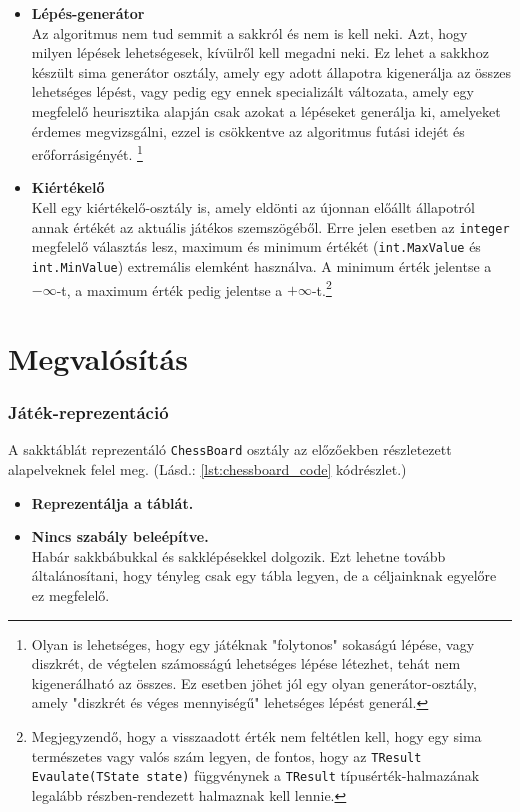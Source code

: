 \documentclass[twoside, a4paper, 12pt]{article}
\begin{document}
\begin{itemize}
	\item \textbf{Lépés-generátor} \\
	Az algoritmus nem tud semmit a sakkról és nem is kell neki. Azt, hogy milyen lépések lehetségesek, kívülről kell megadni neki. Ez lehet a sakkhoz készült sima generátor osztály, amely egy adott állapotra kigenerálja az összes lehetséges lépést, vagy pedig egy ennek specializált változata, amely egy megfelelő heurisztika alapján csak azokat a lépéseket generálja ki, amelyeket érdemes megvizsgálni, ezzel is csökkentve az algoritmus futási idejét és erőforrásigényét. \footnote{Olyan is lehetséges, hogy egy játéknak "folytonos" sokaságú lépése, vagy diszkrét, de végtelen számosságú lehetséges lépése létezhet, tehát nem kigenerálható az összes. Ez esetben jöhet jól egy olyan generátor-osztály, amely "diszkrét és véges mennyiségű" lehetséges lépést generál.}
	
	\item \textbf{Kiértékelő} \\
	Kell egy kiértékelő-osztály is, amely eldönti az újonnan előállt állapotról annak értékét az aktuális játékos szemszögéből. Erre jelen esetben az \texttt{integer} megfelelő választás lesz, maximum és minimum értékét (\texttt{int.MaxValue} és \texttt{int.MinValue}) extremális elemként használva. A minimum érték jelentse a $-\infty$-t, a maximum érték pedig jelentse a $+\infty$-t.\footnote{Megjegyzendő, hogy a visszaadott érték nem feltétlen kell, hogy egy sima természetes vagy valós szám legyen, de fontos, hogy az \texttt{TResult Evaulate(TState state)} függvénynek a \texttt{TResult} típusérték-halmazának legalább részben-rendezett halmaznak kell lennie.}
\end{itemize}























\section{Megvalósítás}

\subsubsection{Játék-reprezentáció}
A sakktáblát reprezentáló \texttt{ChessBoard} osztály az előzőekben részletezett alapelveknek felel meg. (Lásd.: \ref{lst:chessboard_code} kódrészlet.)
\begin{itemize}
	\item \textbf{Reprezentálja a táblát.}
	\item \textbf{Nincs szabály beleépítve.} \\ 
	Habár sakkbábukkal és sakklépésekkel dolgozik. Ezt lehetne tovább általánosítani, hogy tényleg csak egy tábla legyen, de a céljainknak egyelőre ez megfelelő.
\end{itemize}
\end{document}
